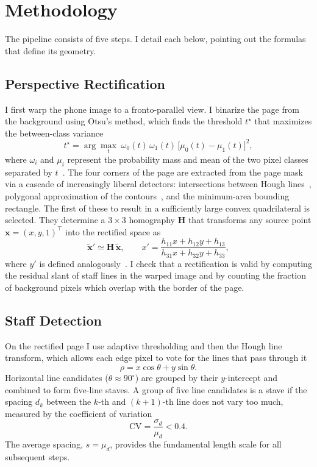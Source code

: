 \section{Methodology}
\label{sec:method}

The pipeline consists of five steps. I detail each below, pointing out the
formulas that define its geometry.

\subsection{Perspective Rectification}
\label{sec:method:rectify}
I first warp the phone image to a fronto-parallel view. I binarize the page from
the background using Otsu's method, which finds the threshold $t^\star$ that
maximizes the between-class variance
\begin{equation}
  t^\star = \arg\max_{t}\; \omega_0(t)\,\omega_1(t)\,\big[\mu_0(t)-\mu_1(t)\big]^2,
  \label{eq:otsu}
\end{equation}
where $\omega_i$ and $\mu_i$ represent the probability mass and mean of the two
pixel classes separated by $t$~\cite{otsu1979threshold}. The four corners of the
page are extracted from the page mask via a cascade of increasingly liberal
detectors: intersections between Hough lines~\cite{duda1972hough}, polygonal
approximation of the contours~\cite{suzuki1985contours}, and the minimum-area
bounding rectangle. The first of these to result in a sufficiently large convex
quadrilateral is selected. They determine a $3\times3$ homography $\mathbf{H}$
that transforms any source point $\mathbf{x}=(x,y,1)^\top$ into the rectified
space as
\begin{equation}
  \tilde{\mathbf{x}}' \simeq \mathbf{H}\,\tilde{\mathbf{x}},
  \qquad
  x' = \frac{h_{11}x+h_{12}y+h_{13}}{h_{31}x+h_{32}y+h_{33}},
  \label{eq:homography}
\end{equation}
where $y'$ is defined analogously~\cite{hartley2004multiple}. I check that a
rectification is valid by computing the residual slant of staff lines in the
warped image and by counting the fraction of background pixels which overlap with
the border of the page.

\subsection{Staff Detection}
\label{sec:method:staves}
On the rectified page I use adaptive thresholding and then the Hough line
transform, which allows each edge pixel to vote for the lines that pass through it
\begin{equation}
  \rho = x\cos\theta + y\sin\theta .
  \label{eq:hough}
\end{equation}
Horizontal line candidates ($\theta\approx 90^{\circ}$) are grouped by their
$y$-intercept and combined to form five-line staves. A group of five line
candidates is a stave if the spacing $d_k$ between the $k$-th and $(k{+}1)$-th
line does not vary too much, measured by the coefficient of variation
\begin{equation}
  \mathrm{CV} = \frac{\sigma_d}{\mu_d} < 0.4 .
  \label{eq:cv}
\end{equation}
The average spacing, $s=\mu_d$, provides the fundamental length scale for all
subsequent steps.

